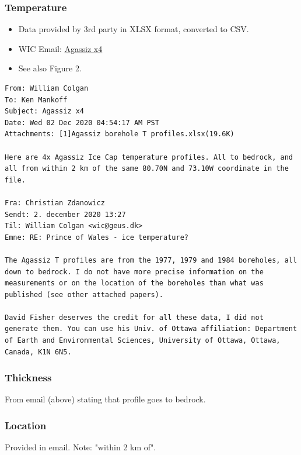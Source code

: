 \documentclass[article,a4paper,times,11pt,twoside]{article}
\begin{document}
\subsubsection{Temperature}
\label{sec:orga89b6c4}

\begin{itemize}
\item Data provided by 3rd party in XLSX format, converted to CSV.
\item WIC Email: \href{msgid:AM0PR04MB6129DE88C9253A951702EE06A2F30@AM0PR04MB6129.eurprd04.prod.outlook.com}{Agassiz x4}
\item See also \textcite{clarke_1987_wind} Figure 2.
\end{itemize}

\begin{verbatim}
From: William Colgan
To: Ken Mankoff
Subject: Agassiz x4
Date: Wed 02 Dec 2020 04:54:17 AM PST
Attachments: [1]Agassiz borehole T profiles.xlsx(19.6K)

Here are 4x Agassiz Ice Cap temperature profiles. All to bedrock, and
all from within 2 km of the same 80.70N and 73.10W coordinate in the
file.

Fra: Christian Zdanowicz
Sendt: 2. december 2020 13:27
Til: William Colgan <wic@geus.dk>
Emne: RE: Prince of Wales - ice temperature?

The Agassiz T profiles are from the 1977, 1979 and 1984 boreholes, all
down to bedrock. I do not have more precise information on the
measurements or on the location of the boreholes than what was
published (see other attached papers).

David Fisher deserves the credit for all these data, I did not
generate them. You can use his Univ. of Ottawa affiliation: Department
of Earth and Environmental Sciences, University of Ottawa, Ottawa,
Canada, K1N 6N5.
\end{verbatim}

\subsubsection{Thickness}
\label{sec:org1570789}

From email (above) stating that profile goes to bedrock.

\subsubsection{Location}
\label{sec:org227a921}

Provided in email. Note: "within 2 km of".
\end{document}
